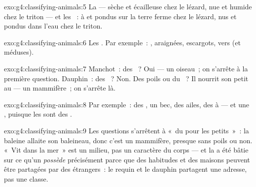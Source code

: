\begin{solution}{exo:g4:classifying-animals:5}
La  --- sèche et écailleuse chez le lézard, nue et humide chez
le triton --- et les ~: à  et pondus sur la terre ferme
chez le lézard, nus et pondus dans l'eau chez le triton.
\end{solution}

\begin{solution}{exo:g4:classifying-animals:6}
Les . Par exemple~: , araignées, escargots, vers
(et méduses).
\end{solution}

\begin{solution}{exo:g4:classifying-animals:7}
Manchot~: des ~? Oui --- un oiseau~; on s'arrête à la première
question. Dauphin~: des ~? Non. Des poils ou du ~? Il
nourrit son petit au  --- un mammifère~; on s'arrête là.
\end{solution}

\begin{solution}{exo:g4:classifying-animals:8}
Par exemple~: des , un bec, des ailes, des  à  ---
et une , puisque les  sont des .
\end{solution}

\begin{solution}{exo:g4:classifying-animals:9}
Les questions s'arrêtent à «~du  pour les petits~»~: la baleine
allaite son baleineau, donc c'est un mammifère, presque sans poils
ou non. «~Vit dans la mer~» est un milieu, pas un caractère du corps
--- et la  a été bâtie sur ce qu'un 
\emph{possède} précisément parce que des habitudes et des maisons
peuvent être partagées par des étrangers~: le requin et le dauphin
partagent une adresse, pas une classe.
\end{solution}

